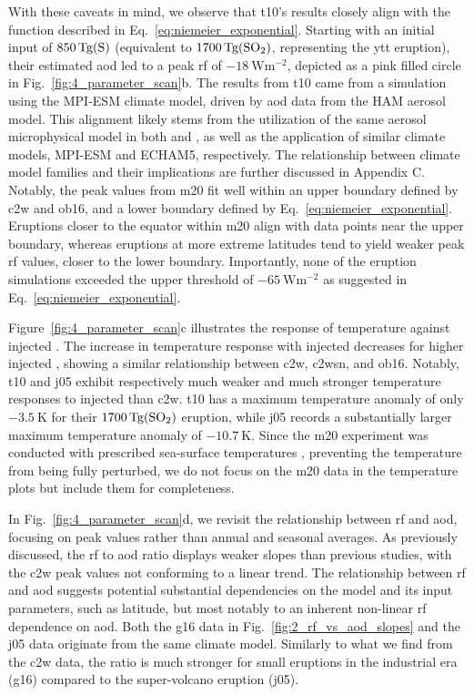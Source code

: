\documentclass{ametsocV6.1}
\newcommand{\iso}[1][i]{{#1}njected \ce{SO2}}
\begin{document}
With these caveats in mind, we observe that \gls{t10}'s results closely align with the
function described in Eq.~\ref{eq:niemeier_exponential}. Starting with an initial input
of \(\SI{850}{\tera\gram(\ce{S})}\) (equivalent to \(\SI{1700}{\tera\gram(\ce{SO2})}\),
representing the \gls{ytt} eruption), their estimated \gls{aod} led to a peak \gls{rf}
of \(\SI{-18}{\watt\meter^{-2}}\), depicted as a pink filled circle in
Fig.~\ref{fig:4_parameter_scan}b. The results from \gls{t10} came from a simulation
using the MPI-ESM climate model, driven by \gls{aod} data from the HAM aerosol model.
This alignment likely stems from the utilization of the same aerosol microphysical model
in both \citet{timmreck2010} and \citet{niemeier2015}, as well as the application of
similar climate models, MPI-ESM and ECHAM5, respectively. The relationship between
climate model families and their implications are further discussed in Appendix C.
Notably, the peak values from \gls{m20} fit well within an upper boundary defined by
\gls{c2w} and \gls{ob16}, and a lower boundary defined by
Eq.~\ref{eq:niemeier_exponential}. Eruptions closer to the equator within \gls{m20}
align with data points near the upper boundary, whereas eruptions at more extreme
latitudes tend to yield weaker peak \gls{rf} values, closer to the lower boundary.
Importantly, none of the eruption simulations exceeded the upper threshold of
\(\SI{-65}{\watt\meter^{-2}}\) as suggested in Eq.~\ref{eq:niemeier_exponential}.

Figure~\ref{fig:4_parameter_scan}c illustrates the response of temperature against
\iso{}. The increase in temperature response with \iso{} decreases for higher \iso{},
showing a similar relationship between \gls{c2w}, \gls{c2wsn}, and \gls{ob16}. Notably,
\gls{t10} and \gls{j05} exhibit respectively much weaker and much stronger temperature
responses to \iso{} than \gls{c2w}. \gls{t10} has a maximum temperature anomaly of only
\(\SI{-3.5}{\kelvin}\) for their \(\SI{1700}{\tera\gram(\ce{SO2})}\) eruption, while
\gls{j05} records a substantially larger maximum temperature anomaly of
\(\SI{-10.7}{\kelvin}\). Since the \gls{m20} experiment was conducted with prescribed
sea-surface temperatures \citep{marshall2020}, preventing the temperature from being
fully perturbed, we do not focus on the \gls{m20} data in the temperature plots but
include them for completeness.

In Fig.~\ref{fig:4_parameter_scan}d, we revisit the relationship between \gls{rf} and
\gls{aod}, focusing on peak values rather than annual and seasonal averages. As
previously discussed, the \gls{rf} to \gls{aod} ratio displays weaker slopes than
previous studies, with the \gls{c2w} peak values not conforming to a linear trend. The
relationship between \gls{rf} and \gls{aod} suggests potential substantial dependencies
on the model and its input parameters, such as latitude, but most notably to an inherent
non-linear \gls{rf} dependence on \gls{aod}. Both the \gls{g16} data in
Fig.~\ref{fig:2_rf_vs_aod_slopes} and the \gls{j05} data originate from the same climate
model. Similarly to what we find from the \gls{c2w} data, the ratio is much stronger for
small eruptions in the industrial era (\gls{g16}) compared to the super-volcano eruption
(\gls{j05}).
\end{document}
